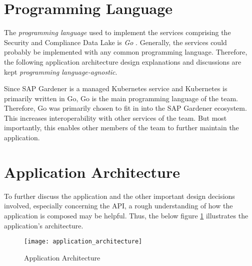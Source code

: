 \section{Programming Language}
The \emph{programming language} used to implement the services comprising the Security and Compliance Data Lake is \emph{Go} \cite{Golang}. Generally, the services could probably be implemented with any common programming language. Therefore, the following application architecture design explanations and discussions are kept \emph{programming language-agnostic}.\par 
Since SAP Gardener is a managed Kubernetes service and Kubernetes is primarily written in Go, Go is the main programming language of the team. Therefore, Go was primarily chosen to fit in into the SAP Gardener ecosystem. This increases interoperability with other services of the team. But most importantly, this enables other members of the team to further maintain the application. 

\section{Application Architecture}
To further discuss the application and the other important design decisions involved, especially concerning the API, a rough understanding of how the application is composed may be helpful. Thus, the below figure \ref{fig:ApplicationArchitecture} illustrates the application's architecture. 

\begin{figure}[H]
	\centering
	\texttt{[image: application\_architecture]}
	\caption[Application Architecture]{Application Architecture }
	\label{fig:ApplicationArchitecture}
\end{figure}

